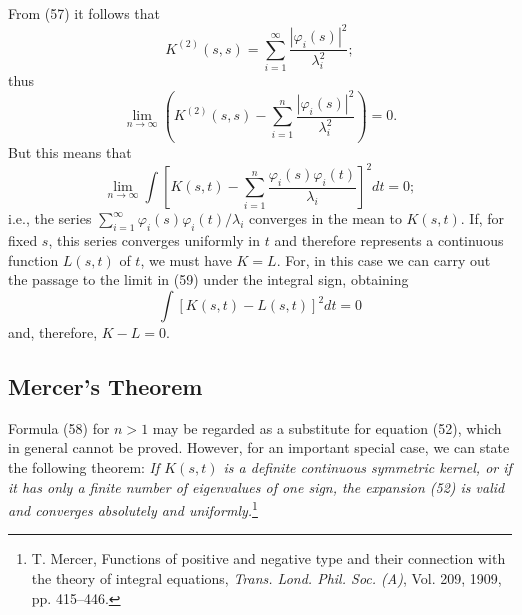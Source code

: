 From (57) it follows that
\[
K^{(2)}(s,s)=\sum_{i=1}^{\infty}\frac{|\varphi_i(s)|^2}{\lambda_i^2};
\]
thus
\[
\lim_{n\to\infty}\left(K^{(2)}(s,s)-\sum_{i=1}^{n}\frac{|\varphi_i(s)|^2}{\lambda_i^2}\right)=0.
\]
But this means that
\begin{equation}\tag{59}
\lim_{n\to\infty}\int\left[K(s,t)-\sum_{i=1}^{n}\frac{\varphi_i(s)\varphi_i(t)}{\lambda_i}\right]^2dt=0;
\end{equation}
i.e., the series $\sum_{i=1}^{\infty}\varphi_i(s)\varphi_i(t)/\lambda_i$ converges in the mean to $K(s,t)$. If, for fixed $s$, this series converges uniformly in $t$ and therefore represents a continuous function $L(s,t)$ of $t$, we must have $K=L$. For, in this case we can carry out the passage to the limit in (59) under the integral sign, obtaining
\[
\int[K(s,t)-L(s,t)]^2dt=0
\]
and, therefore, $K-L=0$.

\subsection{Mercer's Theorem}
Formula (58) for $n>1$ may be regarded as a substitute for equation (52), which in general cannot be proved. However, for an important special case, we can state the following theorem: \emph{If $K(s,t)$ is a definite continuous symmetric kernel, or if it has only a finite number of eigenvalues of one sign, the expansion (52) is valid and converges absolutely and uniformly.}\footnote{T. Mercer, Functions of positive and negative type and their connection with the theory of integral equations, \emph{Trans. Lond. Phil. Soc. (A)}, Vol. 209, 1909, pp. 415--446.}

